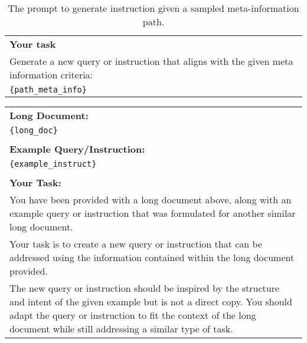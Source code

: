 \begin{table}[h!]
\begin{minipage}{\textwidth}
\begin{tcolorbox}
\begin{tabular}{p{}}
    \\
    \textbf{Your task}\\
    Generate a new query or instruction that aligns with the given meta information criteria:\\
    {\tt \{path{\_}meta{\_}info\}}\\
    \end{tabular}
\end{tcolorbox}
\caption{The prompt to generate instruction given a sampled meta-information path.}
    \label{tab:prompt_path_to_instruct}
\end{minipage}
\end{table}



\begin{table}[h!]\centering
\begin{minipage}{\textwidth}
\centering
\begin{tcolorbox} 
    \centering
   
      \small
    \begin{tabular}{p{}}
    \textbf{Long Document:}\\
    {\tt \{long{\_}doc\}}\\
    \\
    \textbf{Example Query/Instruction:}\\
    {\tt \{example{\_}instruct\}}\\
    \\
    \textbf{Your Task:}\\
    You have been provided with a long document above, along with an example query or instruction that was formulated for another similar long document.\\
    
    Your task is to create a new query or instruction that can be addressed using the information contained within the long document provided.\\
    
    The new query or instruction should be inspired by the structure and intent of the given example but is not a direct copy. You should adapt the query or instruction to fit the context of the long document while still addressing a similar type of task.\\
    

\end{tabular}
\end{tcolorbox}
\end{minipage}
\end{table}
